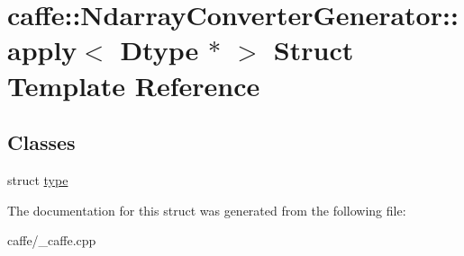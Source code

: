 \hypertarget{structcaffe_1_1_ndarray_converter_generator_1_1apply_3_01_dtype_01_5_01_4}{}\section{caffe\+:\+:Ndarray\+Converter\+Generator\+:\+:apply$<$ Dtype $\ast$ $>$ Struct Template Reference}
\label{structcaffe_1_1_ndarray_converter_generator_1_1apply_3_01_dtype_01_5_01_4}
\subsection*{Classes}
\begin{DoxyCompactItemize}
\item 
struct \hyperlink{structcaffe_1_1_ndarray_converter_generator_1_1apply_3_01_dtype_01_5_01_4_1_1type}{type}
\end{DoxyCompactItemize}


The documentation for this struct was generated from the following file\+:\begin{DoxyCompactItemize}
\item 
caffe/\+\_\+caffe.\+cpp\end{DoxyCompactItemize}

